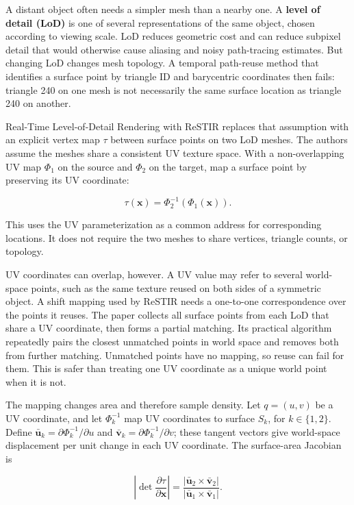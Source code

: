 A distant object often needs a simpler mesh than a nearby one. A \textbf{level of detail (LoD)} is one of several representations of the same object, chosen according to viewing scale. LoD reduces geometric cost and can reduce subpixel detail that would otherwise cause aliasing and noisy path-tracing estimates. But changing LoD changes mesh topology. A temporal path-reuse method that identifies a surface point by triangle ID and barycentric coordinates then fails: triangle 240 on one mesh is not necessarily the same surface location as triangle 240 on another.

Real-Time Level-of-Detail Rendering with ReSTIR replaces that assumption with an explicit vertex map \(\tau\) between surface points on two LoD meshes. The authors assume the meshes share a consistent UV texture space. With a non-overlapping UV map \(\Phi_1\) on the source and \(\Phi_2\) on the target, map a surface point by preserving its UV coordinate:

\[\tau(\mathbf{x})=\Phi_2^{-1}(\Phi_1(\mathbf{x})).\]

This uses the UV parameterization as a common address for corresponding locations. It does not require the two meshes to share vertices, triangle counts, or topology.

UV coordinates can overlap, however. A UV value may refer to several world-space points, such as the same texture reused on both sides of a symmetric object. A shift mapping used by ReSTIR needs a one-to-one correspondence over the points it reuses. The paper collects all surface points from each LoD that share a UV coordinate, then forms a partial matching. Its practical algorithm repeatedly pairs the closest unmatched points in world space and removes both from further matching. Unmatched points have no mapping, so reuse can fail for them. This is safer than treating one UV coordinate as a unique world point when it is not.

The mapping changes area and therefore sample density. Let \(q=(u,v)\) be a UV coordinate, and let \(\Phi_k^{-1}\) map UV coordinates to surface \(S_k\), for \(k\in\{1,2\}\). Define \(\bar{\mathbf{u}}_k=\partial\Phi_k^{-1}/\partial u\) and \(\bar{\mathbf{v}}_k=\partial\Phi_k^{-1}/\partial v\); these tangent vectors give world-space displacement per unit change in each UV coordinate. The surface-area Jacobian is

\[\left|\det\frac{\partial\tau}{\partial\mathbf{x}}\right|=\frac{|\bar{\mathbf{u}}_2\times\bar{\mathbf{v}}_2|}{|\bar{\mathbf{u}}_1\times\bar{\mathbf{v}}_1|}.\]


